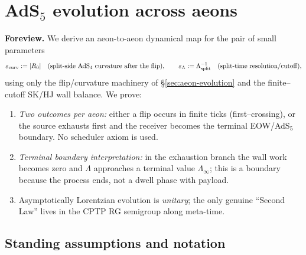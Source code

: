 \documentclass[10pt]{article}
\theoremstyle{definition}
\theoremstyle{plain}
\begin{document}
\section{\texorpdfstring{AdS$_5$ evolution across aeons}{AdS5 evolution across aeons}}
\label{sec:ads5-evolution}

\noindent\textbf{Foreview.}
We derive an aeon-to-aeon dynamical map for the pair of small parameters
\[
\varepsilon_{\rm curv}:=|R_0|\quad\text{(split-side AdS$_4$ curvature after the flip)},\qquad
\varepsilon_\Lambda:=\Lambda_{\rm split}^{-1}\quad\text{(split-time resolution/cutoff)},
\]
using only the flip/curvature machinery of \S\ref{sec:aeon-evolution} and the finite--cutoff SK/HJ wall balance. We prove:
\begin{enumerate}[label=(\roman*),itemsep=2pt,topsep=2pt]
\item \emph{Two outcomes per aeon:} either a flip occurs in finite ticks (first--crossing), or the source exhausts first and the receiver becomes the terminal EOW/AdS$_5$ boundary. No scheduler axiom is used.
\item \emph{Terminal boundary interpretation:} in the exhaustion branch the wall work becomes zero and $\Lambda$ approaches a terminal value $\Lambda_\infty$; this is a boundary because the process ends, not a dwell phase with payload.
\item Asymptotically Lorentzian evolution is \emph{unitary}; the only genuine ``Second Law'' lives in the CPTP RG semigroup along meta-time.
\end{enumerate}

\subsection{Standing assumptions and notation}
\label{subsec:ads5-standing}
\end{document}
